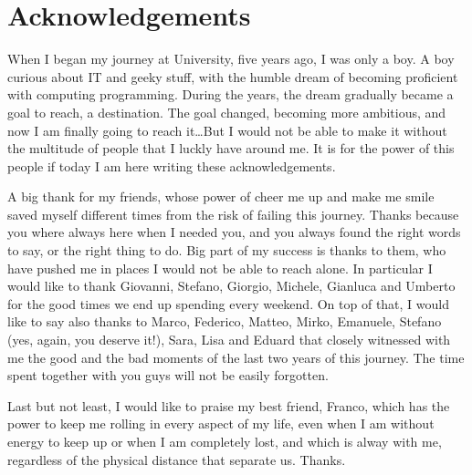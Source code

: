 

\section*{Acknowledgements}


\noindent When I began my journey at University, five years ago, I was only
a boy. A boy curious about IT and geeky stuff, with the humble dream of becoming
proficient with computing programming. During the years, the dream gradually
became a goal to reach, a destination. The goal changed, becoming more
ambitious, and now I am finally going to reach it\dots But I would not be able
to make it without the multitude of people that I luckly have around me. It is
for the power of this people if today I am here writing these acknowledgements.

\vspace{0.3cm}

\noindent A big thank for my friends, whose power of cheer me up and make me
smile saved myself different times from the risk of failing this journey. Thanks
because you where always here when I needed you, and you always found the right
words to say, or the right thing to do. Big part of my success is thanks to
them, who have pushed me in places I would not be able to reach alone. In
particular I would like to thank Giovanni, Stefano, Giorgio, Michele, Gianluca
and Umberto for the good times we end up spending every weekend. On top of that,
I would like to say also thanks to Marco, Federico, Matteo, Mirko, Emanuele,
Stefano (yes, again, you deserve it!), Sara, Lisa and Eduard that closely
witnessed with me the good and the bad moments of the last two years of this
journey. The time spent together with you guys will not be easily forgotten.

\vspace{0.3cm}

\noindent Last but not least, I would like to praise my best friend, Franco,
which has the power to keep me rolling in every aspect of my life, even when I
am without energy to keep up or when I am completely lost, and which is alway
with me, regardless of the physical distance that separate us. Thanks.

\vspace{0.3cm}

